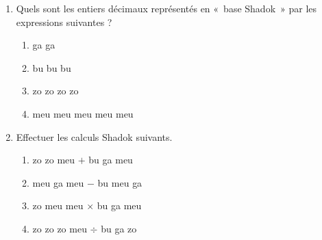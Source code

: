\begin{td}
\noindent\begin{enumerate}
\item Quels sont les entiers décimaux représentés en «~base Shadok~» 
	par les expressions suivantes ?
	\begin{enumerate}
	\item {\sc ga} {\sc ga}
	\item {\sc bu} {\sc bu} {\sc bu}
	\item {\sc zo} {\sc zo} {\sc zo} {\sc zo}
	\item {\sc meu} {\sc meu} {\sc meu} {\sc meu} {\sc meu} 
	\end{enumerate}	
\item Effectuer les calculs Shadok suivants.
	\begin{enumerate}
	\item {\sc zo} {\sc zo} {\sc meu} $+$ {\sc bu} {\sc ga} {\sc meu}
	\item {\sc meu} {\sc ga} {\sc meu} $-$ {\sc bu} {\sc meu} {\sc ga}
	\item {\sc zo} {\sc meu} {\sc meu} $\times$ {\sc bu} {\sc ga} {\sc meu}
	\item {\sc zo} {\sc zo} {\sc zo} {\sc meu} $\div$ {\sc bu} {\sc ga} {\sc zo}
	\end{enumerate}
\end{enumerate}
\end{td}

